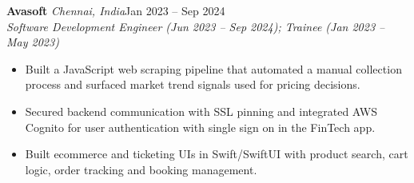 \documentclass[a4paper,11pt]{article}
\newcommand{\role}[4]{%
  \textbf{#1}{\color{muted}\,\textperiodcentered\,\textit{#2}}\hfill{\color{muted}#3}\\
  \textit{#4}\par}
\newcommand{\gap}{\vspace{5pt}}
\begin{document}
\gap
{}
\role{Avasoft}{Chennai, India}{Jan 2023 – Sep 2024}{Software Development Engineer (Jun 2023 – Sep 2024); Trainee (Jan 2023 – May 2023)}
\begin{itemize}
  \item Built a JavaScript web scraping pipeline that automated a manual collection process and surfaced market trend signals used for pricing decisions.
  \item Secured backend communication with SSL pinning and integrated AWS Cognito for user authentication with single sign on in the FinTech app.
  \item Built ecommerce and ticketing UIs in Swift/SwiftUI with product search, cart logic, order tracking and booking management.
\end{itemize}
\end{document}
